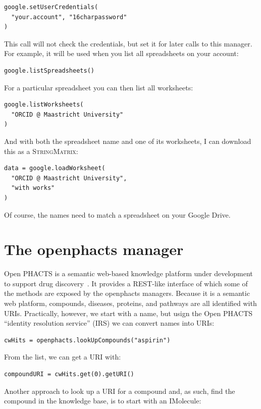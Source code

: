 \documentclass[a5paper, 10pt]{memoir}
\begin{document}
\begin{refsection}
\begin{Verbatim}
google.setUserCredentials(
  "your.account", "16charpassword"
)
\end{Verbatim}

This call will not check the credentials, but set it for later calls to this
manager. For example, it will be used when you list all spreadsheets on your
account:

\begin{Verbatim}
google.listSpreadsheets()
\end{Verbatim}

For a particular spreadsheet you can then list all worksheets:

\begin{Verbatim}
google.listWorksheets(
  "ORCID @ Maastricht University"
)
\end{Verbatim}

And with both the spreadsheet name and one of its worksheets, I can download
this as a \textsc{StringMatrix}:

\begin{Verbatim}
data = google.loadWorksheet(
  "ORCID @ Maastricht University",
  "with works"
)
\end{Verbatim}

Of course, the names need to match a spreadsheet on your Google Drive.

\section{The openphacts manager}

Open PHACTS is a semantic web-based knowledge platform under
development to support drug discovery~\cite{Williams2012}. It provides a
REST-like interface of which some of the methods are exposed by the openphacts
managers. Because it is a semantic web platform, compounds, diseases, proteins,
and pathways are all identified with URIs. Practically, however, we start with
a name, but usign the Open PHACTS ``identity resolution service'' (IRS) we can
convert names into URIs:

\begin{Verbatim}
cwHits = openphacts.lookUpCompounds("aspirin")
\end{Verbatim}
From the list, we can get a URI with:

\begin{Verbatim}
compoundURI = cwHits.get(0).getURI()
\end{Verbatim}
Another approach to look up a URI for a compound and, as such, find the
compound in the knowledge base, is to start with an IMolecule:


\end{refsection}
\end{document}
